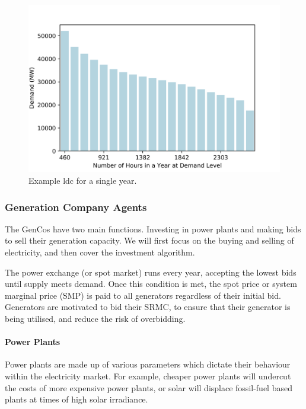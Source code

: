 \begin{figure}
	\centering
	\includegraphics[width=0.95\linewidth]{Chapter4/figures/load_duration_curve}
	\caption{Example \acrfull{ldc} for a single year.}
	\label{fig:loaddurationcurve}
\end{figure}



\subsubsection{Generation Company Agents} The GenCos have two main functions. Investing in power plants and making bids to sell their generation capacity. We will first focus on the buying and selling of electricity, and then cover the investment algorithm.

The power exchange (or spot market) runs every year, accepting the lowest bids until supply meets demand. Once this condition is met, the spot price or system marginal price (SMP) is paid to all generators regardless of their initial bid. Generators are motivated to bid their SRMC, to ensure that their generator is being utilised, and reduce the risk of overbidding.

\paragraph{Power Plants}\label{elecsim:ssssec:powerplantparameters} 

Power plants are made up of various parameters which dictate their behaviour within the electricity market. For example, cheaper power plants will undercut the costs of more expensive power plants, or solar will displace fossil-fuel based plants at times of high solar irradiance.

